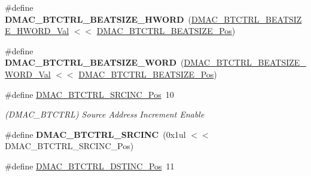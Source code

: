 \begin{DoxyCompactItemize}
\item 
\hypertarget{group___s_a_m_l21___d_m_a_c_gab7a4575684baff9fc357310f7df47645}{}\#define {\bfseries D\+M\+A\+C\+\_\+\+B\+T\+C\+T\+R\+L\+\_\+\+B\+E\+A\+T\+S\+I\+Z\+E\+\_\+\+H\+W\+O\+R\+D}~(\hyperlink{group___s_a_m_l21___d_m_a_c_ga2f763ae7b69389c853910c3486543e84}{D\+M\+A\+C\+\_\+\+B\+T\+C\+T\+R\+L\+\_\+\+B\+E\+A\+T\+S\+I\+Z\+E\+\_\+\+H\+W\+O\+R\+D\+\_\+\+Val} $<$$<$ \hyperlink{group___s_a_m_l21___d_m_a_c_ga4961493aedfe85b741e91f8370b9586c}{D\+M\+A\+C\+\_\+\+B\+T\+C\+T\+R\+L\+\_\+\+B\+E\+A\+T\+S\+I\+Z\+E\+\_\+\+Pos})\label{group___s_a_m_l21___d_m_a_c_gab7a4575684baff9fc357310f7df47645}

\item 
\hypertarget{group___s_a_m_l21___d_m_a_c_ga1ced6d058e9a0168007d8d85cb054a3c}{}\#define {\bfseries D\+M\+A\+C\+\_\+\+B\+T\+C\+T\+R\+L\+\_\+\+B\+E\+A\+T\+S\+I\+Z\+E\+\_\+\+W\+O\+R\+D}~(\hyperlink{group___s_a_m_l21___d_m_a_c_ga17adb4e5668571563f3f60743b7d0d4e}{D\+M\+A\+C\+\_\+\+B\+T\+C\+T\+R\+L\+\_\+\+B\+E\+A\+T\+S\+I\+Z\+E\+\_\+\+W\+O\+R\+D\+\_\+\+Val} $<$$<$ \hyperlink{group___s_a_m_l21___d_m_a_c_ga4961493aedfe85b741e91f8370b9586c}{D\+M\+A\+C\+\_\+\+B\+T\+C\+T\+R\+L\+\_\+\+B\+E\+A\+T\+S\+I\+Z\+E\+\_\+\+Pos})\label{group___s_a_m_l21___d_m_a_c_ga1ced6d058e9a0168007d8d85cb054a3c}

\item 
\hypertarget{group___s_a_m_l21___d_m_a_c_ga1e924a184ddf21b6fb87782fe16fc635}{}\#define \hyperlink{group___s_a_m_l21___d_m_a_c_ga1e924a184ddf21b6fb87782fe16fc635}{D\+M\+A\+C\+\_\+\+B\+T\+C\+T\+R\+L\+\_\+\+S\+R\+C\+I\+N\+C\+\_\+\+Pos}~10\label{group___s_a_m_l21___d_m_a_c_ga1e924a184ddf21b6fb87782fe16fc635}

\begin{DoxyCompactList}\small\item\em (D\+M\+A\+C\+\_\+\+B\+T\+C\+T\+R\+L) Source Address Increment Enable \end{DoxyCompactList}\item 
\hypertarget{group___s_a_m_l21___d_m_a_c_ga706045d27ebf86606bec72d4906b0f72}{}\#define {\bfseries D\+M\+A\+C\+\_\+\+B\+T\+C\+T\+R\+L\+\_\+\+S\+R\+C\+I\+N\+C}~(0x1ul $<$$<$ D\+M\+A\+C\+\_\+\+B\+T\+C\+T\+R\+L\+\_\+\+S\+R\+C\+I\+N\+C\+\_\+\+Pos)\label{group___s_a_m_l21___d_m_a_c_ga706045d27ebf86606bec72d4906b0f72}

\item 
\hypertarget{group___s_a_m_l21___d_m_a_c_ga52908c074e637ddcc2b56d9ea08de372}{}\#define \hyperlink{group___s_a_m_l21___d_m_a_c_ga52908c074e637ddcc2b56d9ea08de372}{D\+M\+A\+C\+\_\+\+B\+T\+C\+T\+R\+L\+\_\+\+D\+S\+T\+I\+N\+C\+\_\+\+Pos}~11\label{group___s_a_m_l21___d_m_a_c_ga52908c074e637ddcc2b56d9ea08de372}


\end{DoxyCompactItemize}
